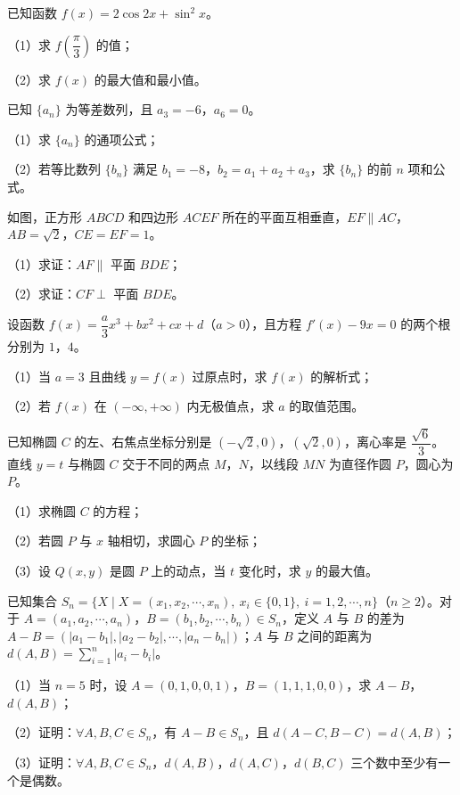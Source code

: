 \begin{question}
已知函数 $f(x)=2\cos2x+\sin^2x$。

（1）求 $f\left(\dfrac\pi3\right)$ 的值；

（2）求 $f(x)$ 的最大值和最小值。

\end{question}
\begingroup
\renewenvironment{question}{\Needspace{0.5\textheight}}{}
\begin{question}
已知 $\{a_n\}$ 为等差数列，且 $a_3=-6$，$a_6=0$。

（1）求 $\{a_n\}$ 的通项公式；

（2）若等比数列 $\{b_n\}$ 满足 $b_1=-8$，$b_2=a_1+a_2+a_3$，求 $\{b_n\}$ 的前 $n$ 项和公式。

\Needspace{0.4\textheight}
\end{question}
\endgroup
\begin{question}
如图，正方形 $ABCD$ 和四边形 $ACEF$ 所在的平面互相垂直，$EF\parallel AC$，$AB=\sqrt2$，$CE=EF=1$。

（1）求证：$AF\parallel$ 平面 $BDE$；

（2）求证：$CF\perp$ 平面 $BDE$。
\nopagebreak[4]
\begin{center}\end{center}
\nopagebreak[4]
\end{question}
\begin{question}
设函数 $f(x)=\dfrac a3x^3+bx^2+cx+d$（$a>0$），且方程 $f'(x)-9x=0$ 的两个根分别为 $1$，$4$。

（1）当 $a=3$ 且曲线 $y=f(x)$ 过原点时，求 $f(x)$ 的解析式；

（2）若 $f(x)$ 在 $(-\infty,+\infty)$ 内无极值点，求 $a$ 的取值范围。

\end{question}
\begin{question}
已知椭圆 $C$ 的左、右焦点坐标分别是 $(-\sqrt2,0)$，$(\sqrt2,0)$，离心率是 $\dfrac{\sqrt6}3$。直线 $y=t$ 与椭圆 $C$ 交于不同的两点 $M$，$N$，以线段 $MN$ 为直径作圆 $P$，圆心为 $P$。

（1）求椭圆 $C$ 的方程；

（2）若圆 $P$ 与 $x$ 轴相切，求圆心 $P$ 的坐标；

（3）设 $Q(x,y)$ 是圆 $P$ 上的动点，当 $t$ 变化时，求 $y$ 的最大值。

\end{question}
\begin{question}
已知集合 $S_n=\{X\mid X=(x_1,x_2,\cdots,x_n),\ x_i\in\{0,1\},\ i=1,2,\cdots,n\}$（$n\geqslant2$）。对于 $A=(a_1,a_2,\cdots,a_n)$，$B=(b_1,b_2,\cdots,b_n)\in S_n$，定义 $A$ 与 $B$ 的差为 $A-B=(|a_1-b_1|,|a_2-b_2|,\cdots,|a_n-b_n|)$；$A$ 与 $B$ 之间的距离为 $d(A,B)=\sum\limits_{i=1}^n|a_i-b_i|$。

（1）当 $n=5$ 时，设 $A=(0,1,0,0,1)$，$B=(1,1,1,0,0)$，求 $A-B$，$d(A,B)$；

（2）证明：$\forall A,B,C\in S_n$，有 $A-B\in S_n$，且 $d(A-C,B-C)=d(A,B)$；

（3）证明：$\forall A,B,C\in S_n$，$d(A,B)$，$d(A,C)$，$d(B,C)$ 三个数中至少有一个是偶数。

\end{question}